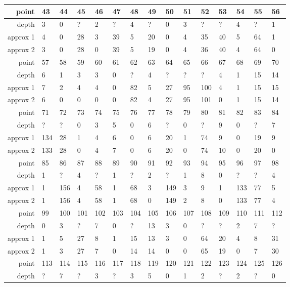 \begin{center}
\begin{supertabular}{|r|l l l l l l l l l l l l l l|}
\hline
point & 43 & 44 & 45 & 46 & 47 & 48 & 49 & 50 & 51 & 52 & 53 & 54 & 55 & 56 \\
\hline
depth & 3 & 0 & ? & 2 & ? & 4 & ? & 0 & 3 & ? & ? & 4 & ? & 1 \\
approx 1 & 4 & 0 & 28 & 3 & 39 & 5 & 20 & 0 & 4 & 35 & 40 & 5 & 64 & 1 \\
approx 2 & 3 & 0 & 28 & 0 & 39 & 5 & 19 & 0 & 4 & 36 & 40 & 4 & 64 & 0 \\
\hline
point & 57 & 58 & 59 & 60 & 61 & 62 & 63 & 64 & 65 & 66 & 67 & 68 & 69 & 70 \\
\hline
depth & 6 & 1 & 3 & 3 & 0 & ? & 4 & ? & ? & ? & 4 & 1 & 15 & 14 \\
approx 1 & 7 & 2 & 4 & 4 & 0 & 82 & 5 & 27 & 95 & 100 & 4 & 1 & 15 & 15 \\
approx 2 & 6 & 0 & 0 & 0 & 0 & 82 & 4 & 27 & 95 & 101 & 0 & 1 & 15 & 14 \\
\hline
point & 71 & 72 & 73 & 74 & 75 & 76 & 77 & 78 & 79 & 80 & 81 & 82 & 83 & 84 \\
\hline
depth & ? & ? & 0 & 3 & 5 & 0 & 6 & ? & 0 & ? & 9 & 0 & ? & 7 \\
approx 1 & 134 & 28 & 1 & 4 & 6 & 0 & 6 & 20 & 1 & 74 & 9 & 0 & 19 & 9 \\
approx 2 & 133 & 28 & 0 & 4 & 7 & 0 & 6 & 20 & 0 & 74 & 10 & 0 & 20 & 0 \\
\hline
point & 85 & 86 & 87 & 88 & 89 & 90 & 91 & 92 & 93 & 94 & 95 & 96 & 97 & 98 \\
\hline
depth & 1 & ? & 4 & ? & 1 & ? & 2 & ? & 1 & 8 & 0 & ? & ? & 4 \\
approx 1 & 1 & 156 & 4 & 58 & 1 & 68 & 3 & 149 & 3 & 9 & 1 & 133 & 77 & 5 \\
approx 2 & 1 & 156 & 4 & 58 & 1 & 68 & 0 & 149 & 2 & 8 & 0 & 133 & 77 & 4 \\
\hline
point & 99 & 100 & 101 & 102 & 103 & 104 & 105 & 106 & 107 & 108 & 109 & 110 & 111 & 112 \\
\hline
depth & 0 & 3 & ? & 7 & 0 & ? & 13 & 3 & 0 & ? & ? & 2 & 7 & ? \\
approx 1 & 1 & 5 & 27 & 8 & 1 & 15 & 13 & 3 & 0 & 64 & 20 & 4 & 8 & 31 \\
approx 2 & 1 & 3 & 27 & 7 & 0 & 14 & 14 & 0 & 0 & 65 & 19 & 0 & 7 & 30 \\
\hline
point & 113 & 114 & 115 & 116 & 117 & 118 & 119 & 120 & 121 & 122 & 123 & 124 & 125 & 126 \\
\hline
depth & ? & 7 & ? & 3 & ? & 3 & 5 & 0 & 1 & 2 & ? & 2 & ? & 0 \\

\end{supertabular}
\end{center}

